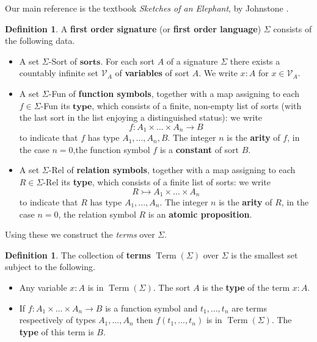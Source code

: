\documentclass[12pt]{article}
\theoremstyle{plain}
\theoremstyle{definition}
\newtheorem{defn}[thm]{Definition} %
\newcommand{\call}[1]{\mathcal{#1}}
\newcommand{\lto}{\longrightarrow}
\begin{document}
	Our main reference is the textbook \emph{Sketches of an Elephant}, by Johnstone \cite{Johnstone}.
	\begin{defn}\label{def:first_order_language}
		A \textbf{first order signature} (or \textbf{first order language}) $\Sigma$ consists of the following data.
		\begin{itemize}
			\item A set $\Sigma$-Sort of $\textbf{sorts}$. For each sort $A$ of a signature $\Sigma$ there exists a countably infinite set $\call{V}_A$ of \textbf{variables} of sort $A$. We write $x:A$ for $x \in \call{V}_A$. 
			\item A set $\Sigma$-Fun of \textbf{function symbols}, together with a map assigning to each $f \in \Sigma$-Fun its $\textbf{type}$, which consists of a finite, non-empty list of sorts (with the last sort in the list enjoying a distinguished status): we write
			\begin{equation}
				f: A_1 \times \hdots\times A_n \lto B
			\end{equation}
			to indicate that $f$ has type $A_1,...,A_n,B$. The integer $n$ is the \textbf{arity} of $f$, in the case $n = 0$,the function symbol $f$ is a \textbf{constant} of sort $B$.
			\item A set $\Sigma$-Rel of \textbf{relation symbols}, together with a map assigning to each $R \in \Sigma$-Rel its \textbf{type}, which consists of a finite list of sorts: we write
			\begin{equation}
				R \rightarrowtail A_1 \times \hdots \times A_n
			\end{equation}
			to indicate that $R$ has type $A_1,...,A_n$. The integer $n$ is the \textbf{arity} of $R$, in the case $n = 0$, the relation symbol $R$ is an \textbf{atomic proposition}.
		\end{itemize}
	\end{defn}
	Using these we construct the \emph{terms} over $\Sigma$.
	\begin{defn}
		The collection of \textbf{terms} $\operatorname{Term}(\Sigma)$ over $\Sigma$ is the smallest set subject to the following.
		\begin{itemize}
			\item Any variable $x:A$ is in $\operatorname{Term}(\Sigma)$. The sort $A$ is the \textbf{type} of the term $x:A$.
			\item If $f: A_1 \times \hdots \times A_n \lto B$ is a function symbol and $t_1,...,t_n$ are terms respectively of types $A_1,...,A_n$ then $f(t_1,...,t_n)$ is in $\operatorname{Term}(\Sigma)$. The \textbf{type} of this term is $B$.
		\end{itemize}
	\end{defn}
\end{document}
